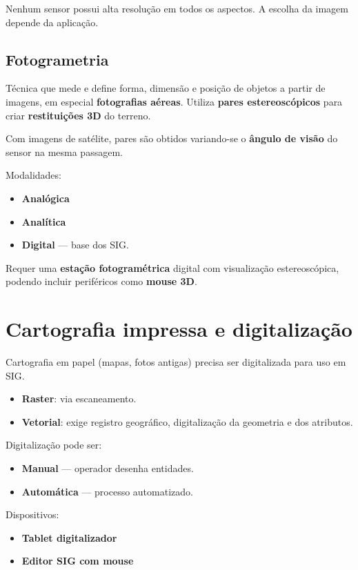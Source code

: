 Nenhum sensor possui alta resolução em todos os aspectos. A escolha da imagem depende da aplicação.

\subsection{Fotogrametria}

Técnica que mede e define forma, dimensão e posição de objetos a partir de imagens, em especial \textbf{fotografias aéreas}. Utiliza \textbf{pares estereoscópicos} para criar \textbf{restituições 3D} do terreno.

Com imagens de satélite, pares são obtidos variando-se o \textbf{ângulo de visão} do sensor na mesma passagem.

Modalidades:
\begin{itemize}
\item \textbf{Analógica}
\item \textbf{Analítica}
\item \textbf{Digital} — base dos SIG.
\end{itemize}

Requer uma \textbf{estação fotogramétrica} digital com visualização estereoscópica, podendo incluir periféricos como \textbf{mouse 3D}.

\section{Cartografia impressa e digitalização}

Cartografia em papel (mapas, fotos antigas) precisa ser digitalizada para uso em SIG.

\begin{itemize}
\item \textbf{Raster}: via escaneamento.
\item \textbf{Vetorial}: exige registro geográfico, digitalização da geometria e dos atributos.
\end{itemize}

Digitalização pode ser:
\begin{itemize}
\item \textbf{Manual} — operador desenha entidades.
\item \textbf{Automática} — processo automatizado.
\end{itemize}

Dispositivos:

\begin{itemize}
\item \textbf{Tablet digitalizador}
\item \textbf{Editor SIG com mouse}
\end{itemize}

